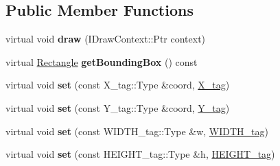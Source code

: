 \subsection*{Public Member Functions}
\begin{DoxyCompactItemize}
\item 
\hypertarget{classsambag_1_1disco_1_1svg_1_1_svg_rect_a1a31a397e5c6aad2c83e07318278139a}{
virtual void {\bfseries draw} (IDrawContext::Ptr context)}
\label{classsambag_1_1disco_1_1svg_1_1_svg_rect_a1a31a397e5c6aad2c83e07318278139a}

\item 
\hypertarget{classsambag_1_1disco_1_1svg_1_1_svg_rect_a8b98650b0a06c0402f9f1e41f915e401}{
virtual \hyperlink{classsambag_1_1com_1_1_rectangle}{Rectangle} {\bfseries getBoundingBox} () const }
\label{classsambag_1_1disco_1_1svg_1_1_svg_rect_a8b98650b0a06c0402f9f1e41f915e401}

\item 
\hypertarget{classsambag_1_1disco_1_1svg_1_1_svg_rect_ad0c483c304a55b6cb0d0eb8a357c6b0d}{
virtual void {\bfseries set} (const X\_\-tag::Type \&coord, \hyperlink{structsambag_1_1disco_1_1svg_1_1_svg_rect_1_1_x__tag}{X\_\-tag})}
\label{classsambag_1_1disco_1_1svg_1_1_svg_rect_ad0c483c304a55b6cb0d0eb8a357c6b0d}

\item 
\hypertarget{classsambag_1_1disco_1_1svg_1_1_svg_rect_af57c645d66676b4424c39c000568e6a7}{
virtual void {\bfseries set} (const Y\_\-tag::Type \&coord, \hyperlink{structsambag_1_1disco_1_1svg_1_1_svg_rect_1_1_y__tag}{Y\_\-tag})}
\label{classsambag_1_1disco_1_1svg_1_1_svg_rect_af57c645d66676b4424c39c000568e6a7}

\item 
\hypertarget{classsambag_1_1disco_1_1svg_1_1_svg_rect_acc9f6e654790cee577766040f5fa3f8d}{
virtual void {\bfseries set} (const WIDTH\_\-tag::Type \&w, \hyperlink{structsambag_1_1disco_1_1svg_1_1_svg_rect_1_1_w_i_d_t_h__tag}{WIDTH\_\-tag})}
\label{classsambag_1_1disco_1_1svg_1_1_svg_rect_acc9f6e654790cee577766040f5fa3f8d}

\item 
\hypertarget{classsambag_1_1disco_1_1svg_1_1_svg_rect_a424bac3cb498825a3b46581c108d11f3}{
virtual void {\bfseries set} (const HEIGHT\_\-tag::Type \&h, \hyperlink{structsambag_1_1disco_1_1svg_1_1_svg_rect_1_1_h_e_i_g_h_t__tag}{HEIGHT\_\-tag})}
\label{classsambag_1_1disco_1_1svg_1_1_svg_rect_a424bac3cb498825a3b46581c108d11f3}

\end{DoxyCompactItemize}
